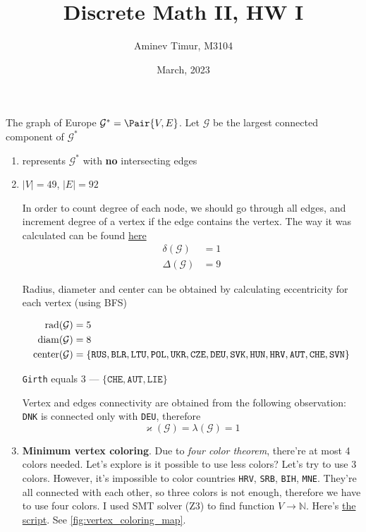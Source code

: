 \documentclass[12pt, a4paper]{article}
\title{Discrete Math II, HW I}
\date{March, 2023}
\author{Aminev Timur, M3104}
\newcommand\EGraph{\mathcal{G}^{*}}
\newcommand\EGraphL{\mathcal{G}}
\begin{document}
\maketitle

\problem The graph of Europe \(\EGraph = \Pair{V, E}\). Let \(\EGraphL\) be the
largest connected component of \(\EGraph\)

\begin{enumerate}[label=\alph*)]
\item {} represents \(\EGraph\) with \textbf{no} intersecting
edges
\item \(|V| = 49\), \(|E| = 92\)

In order to count degree of each node, we should go through all edges, and
increment degree of a vertex if the edge contains the vertex.
The way it was calculated can be found
\href{https://github.com/ablearthy-itmo-39828cf299f04949c86/discrete-math-2-hw-1/blob/c665370/auto/general.py}{here}
\begin{align*}
\delta(\EGraphL) &= 1 \\
\Delta(\EGraphL) &= 9
\end{align*}

Radius, diameter and center can be obtained by calculating eccentricity for
each vertex (using BFS)

\begin{align*}
\rad(\EGraphL) &= 5 \\
\diam(\EGraphL) &= 8 \\
\mycenter(\EGraphL) &= \{\texttt{RUS}, \texttt{BLR}, \texttt{LTU}, \texttt{POL}, \texttt{UKR}, \texttt{CZE}, \texttt{DEU}, \texttt{SVK}, \texttt{HUN}, \texttt{HRV}, \texttt{AUT}, \texttt{CHE}, \texttt{SVN}\}
\end{align*}

\texttt{Girth} equals 3 --- \(\{\texttt{CHE}, \texttt{AUT}, \texttt{LIE}\}\)

Vertex and edges connectivity are obtained from the following observation:
\texttt{DNK} is connected only with \texttt{DEU}, therefore
\[\varkappa(\EGraphL) = \lambda(\EGraphL) = 1\]

\item \textbf{Minimum vertex coloring}. Due to \textit{four color theorem},
there're at most 4 colors needed. Let's explore is it possible to use less
colors? Let's try to use 3 colors. However, it's impossible to color countries
\texttt{HRV}, \texttt{SRB}, \texttt{BIH}, \texttt{MNE}. They're all connected
with each other, so three colors is not enough, therefore we have to use four
colors. I used SMT solver (Z3) to find function \(V \to \mathbb{N}\). Here's
\href{https://github.com/ablearthy-itmo-39828cf299f04949c86/discrete-math-2-hw-1/blob/753891b/auto/vertex_coloring.py}{the
script}. See \cref{fig:vertex_coloring_map}.


\end{enumerate}
\end{document}
